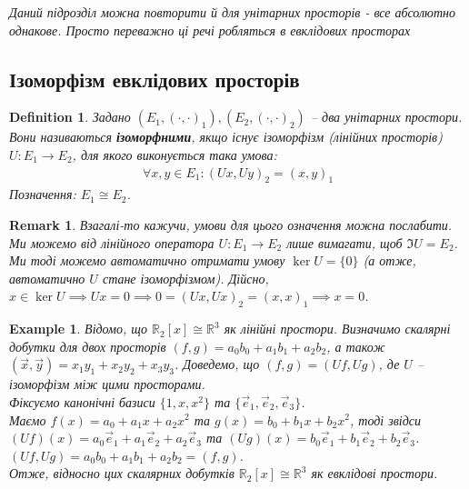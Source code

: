 \documentclass[a4paper, 10pt]{article}
\theoremstyle{theoremdd}
\newtheorem{definition}[theorem]{Definition}
\newtheorem{example}[theorem]{Example}
\newtheorem{remark}[theorem]{Remark}
\begin{document}
\noindent
\textit{Даний підрозділ можна повторити й для унітарних просторів - все абсолютно однакове. Просто переважно ці речі робляться в евклідових просторах}

\subsection{Ізоморфізм евклідових просторів}
\begin{definition}
Задано $(E_1,(\cdot,\cdot)_1), (E_2,(\cdot,\cdot)_2)$ -- два унітарних простори.\\
Вони називаються \textbf{ізоморфними}, якщо існує ізоморфізм (лінійних просторів) $U \colon E_1 \to E_2$, для якого виконується така умова:
\begin{align*}
\forall x,y \in E_1: (Ux,Uy)_2 = (x,y)_1
\end{align*}
Позначення: $E_1 \cong E_2$.
\end{definition}

\begin{remark}
Взагалі-то кажучи, умови для цього означення можна послабити. Ми можемо від лінійного оператора $U \colon E_1 \to E_2$ лише вимагати, щоб $\Im U = E_2$. Ми тоді можемо автоматично отримати умову $\ker U = \{0\}$ (а отже, автоматично $U$ стане ізоморфізмом). Дійсно,\\
$x \in \ker U \implies Ux = 0 \implies 0 = (Ux,Ux)_2 = (x,x)_1 \implies x = 0$.
\end{remark}

\begin{example}
Відомо, що $\mathbb{R}_{2}[x] \cong \mathbb{R}^3$ як лінійні простори. Визначимо скалярні добутки для двох просторів $(f,g) = a_0b_0 + a_1b_1 + a_{2}b_{2}$, а також $(\vec{x},\vec{y}) = x_1y_1 + x_2y_2 + x_3y_3$. Доведемо, що $(f,g) = (Uf,Ug)$, де $U$ -- ізоморфізм між цими просторами.\\
Фіксуємо канонічні базиси $\{1,x,x^2\}$ та $\{\vec{e}_1,\vec{e}_2,\vec{e}_3\}$.\\ Маємо $f(x) = a_0 + a_1 x + a_2 x^2$ та $g(x) = b_0 + b_1 x + b_2 x^2$, тоді звідси\\
$(Uf)(x) = a_0 \vec{e}_1 + a_1 \vec{e}_2 + a_2 \vec{e}_3$ та $(Ug)(x) = b_0 \vec{e}_1 + b_1 \vec{e}_2 + b_2 \vec{e}_3$.\\
$(Uf,Ug) = a_0b_0 + a_1b_1 + a_2b_2 = (f,g)$.\\
Отже, відносно цих скалярних добутків $\mathbb{R}_{2}[x] \cong \mathbb{R}^3$ як евклідові простори.
\end{example}
\end{document}
